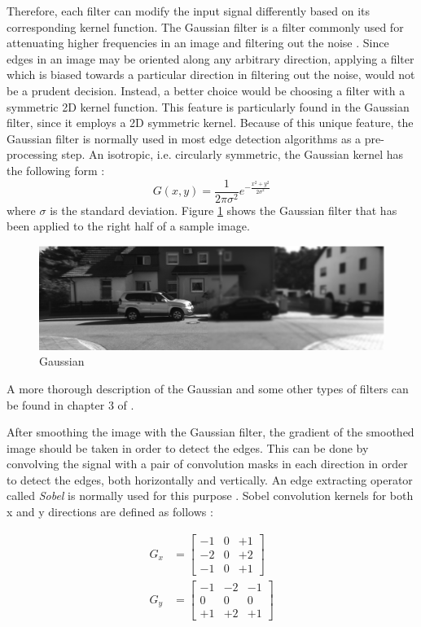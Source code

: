 Therefore, each filter can modify the input signal differently based on its corresponding kernel function.
The Gaussian filter is a filter commonly used for attenuating higher frequencies in an image and filtering out the noise \cite{wells86}. 
Since edges in an image may be oriented along any arbitrary direction, 
applying a filter which is biased towards a particular direction in filtering out the noise, would not be a prudent decision. Instead, a better choice would be choosing a filter 
with a symmetric 2D kernel function. 
This feature is particularly found in the Gaussian filter, since it employs a 2D symmetric kernel. Because of this unique feature, 
the Gaussian filter is normally used in most edge detection algorithms as a pre-processing step.
An isotropic, i.e. circularly symmetric, the Gaussian kernel has the following form \cite{sze11}:
\begin{equation}
G(x,y)=\frac{1}{2\pi \sigma ^{2}} e^{-\frac{x^{2}+y^{2}}{2\sigma^{2}}}
\end{equation}
where $\sigma$ is the standard deviation. 
Figure \ref{fig:gauss} shows the Gaussian filter that has been applied to the right half of a sample image.

\begin{figure}[H]
\centering
\includegraphics[scale=0.43]{left5Gblur}
\caption{Gaussian}
\label{fig:gauss}
\end{figure} 


A more thorough description of the Gaussian and some other types of filters can be found in chapter 3 of \cite{sze11}.

After smoothing the image with the Gaussian filter, the gradient of the smoothed image should be taken in order to detect the edges. This can be done by convolving 
the signal with a pair of convolution masks in each direction in order to detect the edges, both horizontally and vertically. An edge extracting operator called {\it Sobel} is normally used
for this purpose \cite{sobel78}. 
Sobel convolution kernels for both x and y directions are defined as follows \cite{sobel78}:

\begin{align}
G_{x} &= \begin{bmatrix}
-1 & 0 & +1 \\ 
-2 & 0 & +2 \\ 
-1 & 0 & +1
\end{bmatrix} \\
G_{y} &= \begin{bmatrix}
-1 & -2 & -1 \\ 
0 & 0 & 0 \\ 
+1 & +2 & +1
\end{bmatrix}
\end{align}

